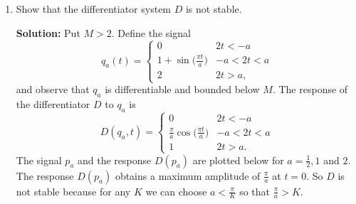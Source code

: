 \documentclass[11pt,a4paper]{book}
\theoremstyle{plain}
\numberwithin{equation}{section}
\newenvironment{solution}{\begin{footnotesize}\textbf{Solution:}}{\end{footnotesize}}
\newenvironment{excersizelist}{%
  \renewcommand*{\theenumi}{\thechapter.\arabic{enumi}}%
  \newcommand\itemadvanced{\stepcounter{enumi}\item[$\ast$\, \theenumi.]}
  \begin{enumerate}
}{%
  \end{enumerate}
}
\begin{document}
\begin{excersizelist}
\item \label{excer:diffnotstable} Show that the differentiator system $D$ is not  stable.
\begin{solution}
Put $M > 2$.  Define the signal
\[
q_a(t) = \begin{cases}
0 & 2t < -a \\
1 + \sin\big(\tfrac{\pi t}{a}\big) & -a < 2t < a \\
2 & 2t > a,
\end{cases}
\]
and observe that $q_a$ is differentiable and bounded below $M$.  The response of the differentiator $D$ to $q_a$ is
\[
D(q_a,t) = \begin{cases}
0 & 2t < -a \\
\tfrac{\pi}{a} \cos\big(\tfrac{\pi t}{a}\big) & -a < 2t < a \\
1 & 2t > a.
\end{cases}
\]
The signal $p_a$ and the response $D(p_a)$ are plotted below for $a = \tfrac{1}{2},1$ and $2$.  The response $D(p_a)$ obtains a maximum amplitude of $\tfrac{\pi}{a}$ at $t=0$.  So $D$ is not stable because for any $K$ we can choose $a < \tfrac{\pi}{K}$ so that $\tfrac{\pi}{a} > K$.

\newcommand{\sinpulse}[1]{
\draw[color=black,thick] (-1.5,0) -- (-#1/2,0) node {};
\draw[smooth,color=black,thick,domain=-#1/2.0:#1/2.0] plot function{1 + sin(3.14159265359*x/#1)};
\draw[color=black,thick] (#1/2,2) -- (1.5,2)  node {};
}
\newcommand{\responsesinpulse}[1]{
\draw[color=black,thick] (-1.5,0) -- (-#1/2,0) node {};
\draw[smooth,color=black,thick,domain=-#1/2.0:#1/2.0] plot function{3.14159265359/#1*cos(3.14159265359*x/#1)};
\draw[color=black,thick] (#1/2,0) -- (1.5,0)  node {};
}
\newcommand{\sinpulseresponse}[1]{}
\begin{center}
\;\;
\end{center}
\end{solution}


\end{excersizelist}
\end{document}

